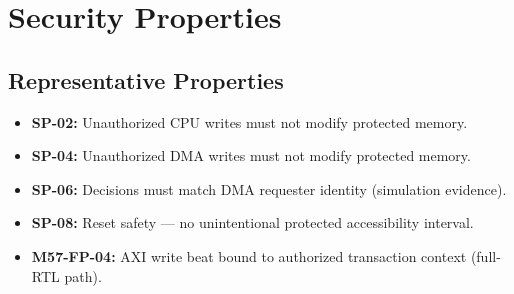 \section{Security Properties}
\label{sec:properties}


\subsection{Representative Properties}
\begin{itemize}
  \item \textbf{SP-02:} Unauthorized CPU writes must not modify protected memory.
  \item \textbf{SP-04:} Unauthorized DMA writes must not modify protected memory.
  \item \textbf{SP-06:} Decisions must match DMA requester identity (simulation evidence).
  \item \textbf{SP-08:} Reset safety --- no unintentional protected accessibility interval.
  \item \textbf{M57-FP-04:} AXI write beat bound to authorized transaction context (full-RTL path).
\end{itemize}


